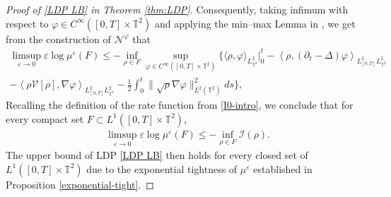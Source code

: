 \begin{proof}[Proof of \eqref{LDP LB} in Theorem \ref{thm:LDP}]
Consequently, taking infimum with respect to $\varphi\in C^{\infty}([0,T]\times\mathbb{T}^2)$ and applying the min--max Lemma in \cite[Lemma 3.2]{KL}, we get from the construction of $\mathcal{N}^{\varphi}$ that
\begin{align*}
\limsup_{\varepsilon\rightarrow 0}\varepsilon \log\mu^{\varepsilon}(F)
\leq - \inf_{\rho\in F}\sup_{\varphi\in C^{\infty}([0,T]\times\mathbb{T}^2)}\Big\{ \langle \rho,\varphi \rangle_{L^2_{\mathbb{T}^2}} \Big|_0^t - \left\langle \rho,(\partial_t - \Delta)\varphi\right\rangle_{L^2_{[0,T]}L^2_{\mathbb{T}^2}} \qquad \\ - \left\langle\rho \mathcal{V}[\rho],\nabla\varphi \right\rangle_{L^2_{[0,T]}L^2_{\mathbb{T}^2}} - \frac{1}{2}\int_0^t\|\sqrt{\rho}\nabla\varphi\|_{L^2(\mathbb{T}^2)}^2ds\Big\},
\end{align*}
Recalling the definition of the rate function from \eqref{I0-intro}, we conclude that for every compact set $F\subset L^1([0,T]\times \mathbb{T}^2)$, 
\begin{align*}
&\limsup_{\varepsilon\rightarrow0}\varepsilon \log\mu^{\varepsilon}(F)\leq-\inf_{\rho\in F}\mathcal{I}(\rho). 
\end{align*}
The upper bound of LDP \eqref{LDP LB} then holds for every closed set of $L^1([0,T]\times \mathbb{T}^2)$ due to the exponential tightness of $\mu^{\varepsilon}$ established in Proposition \ref{exponential-tight}. 
\end{proof}
